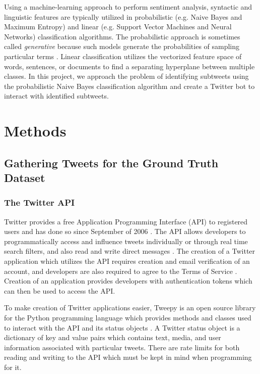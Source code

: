 \documentclass[11pt, twoside, reqno]{book}
\begin{document}
Using a machine-learning approach to perform sentiment analysis, syntactic and linguistic features are typically utilized in probabilistic (e.g. Naive Bayes and Maximum Entropy) and linear (e.g. Support Vector Machines and Neural Networks) classification algorithms. The probabilistic approach is sometimes called \textit{generative} because such models generate the probabilities of sampling particular terms \cite{sentiment_survey}. Linear classification utilizes the vectorized feature space of words, sentences, or documents to find a separating hyperplane between multiple classes. In this project, we approach the problem of identifying subtweets using the probabilistic Naive Bayes classification algorithm and create a Twitter bot to interact with identified subtweets. 

\chapter{Methods}
\label{methods}

\section{Gathering Tweets for the Ground Truth Dataset}
\label{gathering_tweets}

\subsection{The Twitter API}
\label{twitter_api}

Twitter provides a free Application Programming Interface (API) to registered users and has done so since September of 2006 \cite{twitter_api_start}. The API allows developers to programmatically access and influence tweets individually or through real time search filters, and also read and write direct messages \cite{twitter_api_docs}. The creation of a Twitter application which utilizes the API requires creation and email verification of an account, and developers are also required to agree to the Terms of Service \cite{twitter_tos}. Creation of an application provides developers with authentication tokens which can then be used to access the API.

To make creation of Twitter applications easier, Tweepy \cite{tweepy_python} is an open source library for the Python programming language which provides methods and classes used to interact with the API and its status objects \cite{tweepy_status_object}. A Twitter status object is a dictionary of key and value pairs which contains text, media, and user information associated with particular tweets. There are rate limits for both reading and writing to the API which must be kept in mind when programming for it.
\end{document}
